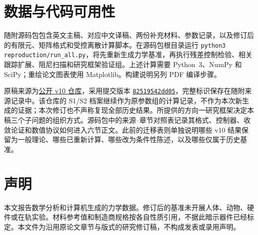 \section*{数据与代码可用性}
随附源码包包含英文主稿、对应中文译稿、两份补充材料、参数记录，以及修订后的有限元、矩阵格式和受控离散计算脚本。在源码包根目录运行 \texttt{python3 reproduction/run\_all.py}，将先重新生成力学基准，再执行残差控制检验、相关跟踪扩展、阻尼扫描和研究框架验证组。上述计算需要 Python~3、NumPy 和 SciPy；重绘论文图表使用 Matplotlib。构建说明另列 PDF 编译步骤。

原稿来源为\href{https://github.com/mop74720-commits/IJRR_CHNN_KAM_v10_20261007}{公开 v10 仓库}，采用提交版本 \href{https://github.com/mop74720-commits/IJRR_CHNN_KAM_v10_20261007/tree/82519542dd057e8fbd6d6879ef33217761e8cbbb}{\texttt{82519542dd05}}，完整标识保存在随附来源记录中。该仓库的 S1/S2 档案继续作为原参数组的计算记录，不作为本次新生成的证据；本次修订也不声称复现全部历史结果。所提供的方向一研究框架决定本稿三个子问题的组织方式。源码包中的来源--章节对照表记录其格式、控制器、收敛论证和数值协议如何进入六节正文。此前的迁移表则单独说明哪些 v10 结果保留为一般理论、哪些已重新计算、哪些改为条件性陈述，以及哪些仅属于历史基准。

\section*{声明}
本文报告数学分析和计算机生成的力学数据。修订后的基准未开展人体、动物、硬件或在轨实验。材料参考值和制造商规格按各自性质引用，不据此暗示器件已经标定。本文件为沿用原论文章节与版式的研究修订稿，不构成发表或录用声明。
